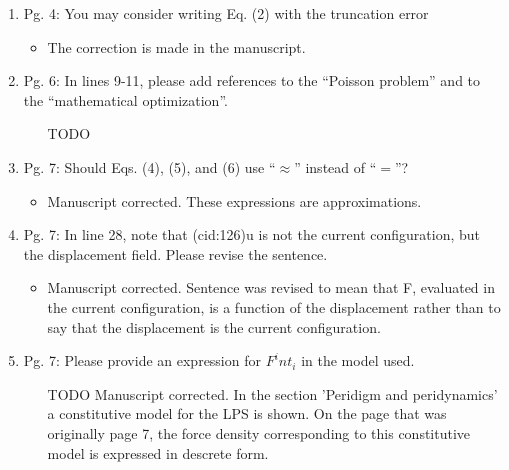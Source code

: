 \documentclass{article}
\begin{document}
\begin{enumerate}
  \item 
Pg. 4: You may consider writing Eq. (2) with the truncation error

{\color{red}  
\begin{itemize}
     \item
      The correction is made in the manuscript.
  \end{itemize}}

\item
Pg. 6: In lines 9-11, please add references to the “Poisson problem” and to the
“mathematical optimization”.

{\color{red}  
\begin{itemize}
     \item
         [TODO]
         
  \end{itemize}}

\item
Pg. 7: Should Eqs. (4), (5), and (6) use “$\approx$” instead of “$=$”?

{\color{red}  
\begin{itemize}
     \item
         Manuscript corrected. These expressions are approximations.
  \end{itemize}}

\item
Pg. 7: In line 28, note that (cid:126)u is not the current conﬁguration, but the displacement
ﬁeld. Please revise the sentence.

{\color{red}  
\begin{itemize}
    \item
        Manuscript corrected. Sentence was revised to mean that F, evaluated in the current configuration, is a function of the displacement rather than to say that the displacement is the current configuration.
        \end{itemize}}

\item
Pg. 7: Please provide an expression for ${F^int}_i$ in the model used.

{\color{red}  
\begin{itemize}
    \item
        [TODO]
        Manuscript corrected. In the section 'Peridigm and peridynamics' a constitutive model for the LPS is shown. On the page that was originally page 7, the force density corresponding to this constitutive model is expressed in descrete form.
  \end{itemize}}


\end{enumerate}
\end{document}
